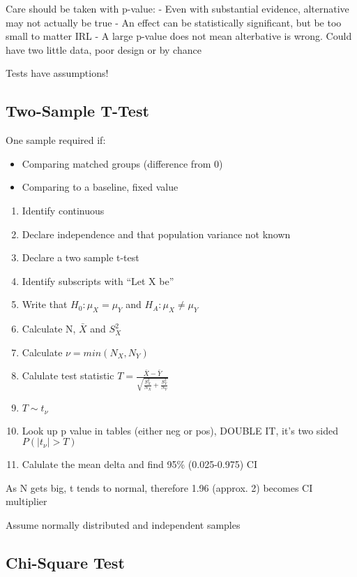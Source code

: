 \documentclass[
  letterpaper,
  DIV=11,
  numbers=noendperiod]{scrreprt}
\providecommand{\tightlist}{%
  \setlength{\itemsep}{0pt}\setlength{\parskip}{0pt}}\usepackage{longtable,booktabs,array}
\begin{document}
Care should be taken with p-value: - Even with substantial evidence,
alternative may not actually be true - An effect can be statistically
significant, but be too small to matter IRL - A large p-value does not
mean alterbative is wrong. Could have two little data, poor design or by
chance

Tests have assumptions!

\hypertarget{two-sample-t-test}{%
\subsection{Two-Sample T-Test}\label{two-sample-t-test}}

One sample required if:

\begin{itemize}
\tightlist
\item
  Comparing matched groups (difference from 0)
\item
  Comparing to a baseline, fixed value
\end{itemize}

\begin{enumerate}
\def\labelenumi{\arabic{enumi})}
\item
  Identify continuous
\item
  Declare independence and that population variance not known
\item
  Declare a two sample t-test
\item
  Identify subscripts with ``Let X be''
\item
  Write that \(H_0 : \mu_X = \mu_Y\) and \(H_A : \mu_X \neq \mu_Y\)
\item
  Calculate N, \(\bar{X}\) and \(S^2_X\)
\item
  Calculate \(\nu = min(N_X, N_Y)\)
\item
  Calulate test statistic
  \(T = \frac{\bar{X} - \bar{Y}}{\sqrt{\frac{S_X^2}{N_X} + \frac{S_Y^2}{N_Y}}}\)
\item
  \(T \sim t_{\nu}\)
\item
  Look up p value in tables (either neg or pos), DOUBLE IT, it's two
  sided \(P( |t_{\nu}| > T)\)
\item
  Calulate the mean delta and find 95\% (0.025-0.975) CI
\end{enumerate}

As N gets big, t tends to normal, therefore 1.96 (approx. 2) becomes CI
multiplier

Assume normally distributed and independent samples

\hypertarget{chi-square-test}{%
\subsection{Chi-Square Test}\label{chi-square-test}}
\end{document}
